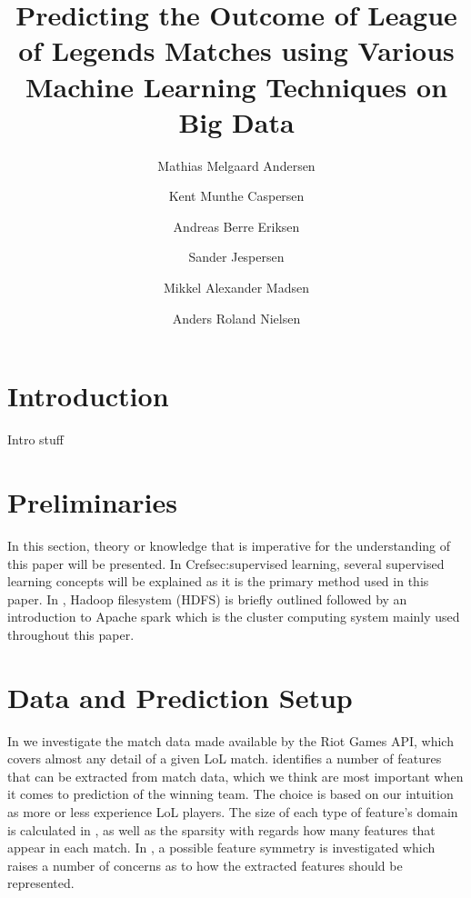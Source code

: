 \documentclass[columns=,boxcolor=white]{datart}
\title{Predicting the Outcome of League of Legends Matches using Various Machine Learning Techniques on Big Data}
\date{}
\author{Mathias Melgaard Andersen}
\author{Kent Munthe Caspersen}
\author{Andreas Berre Eriksen}
\author{Sander Jespersen}
\author{Mikkel Alexander Madsen}
\author{Anders Roland Nielsen}
\affil{Department of Computer Science, Aalborg University}
\begin{document}
\usetikzlibrary{arrows,intersections,shapes.geometric,calc}
\maketitle




\section{Introduction}\label{sec:intro}
Intro stuff





\section{Preliminaries}\label{sec:prelim}
In this section, theory or knowledge that is imperative for the understanding of this paper will be presented. In Cref{sec:supervised learning}, several supervised learning concepts will be explained as it is the primary method used in this paper. In , Hadoop filesystem (HDFS) is briefly outlined followed by an introduction to Apache spark which is the cluster computing system mainly used throughout this paper.




\section{Data and Prediction Setup}\label{sec:features}
In  we investigate the match data made available by the Riot Games API, which covers almost any detail of a given LoL match.
 identifies a number of features that can be extracted from match data, which we think are most important when it comes to prediction of the winning team. The choice is based on our intuition as more or less experience LoL players. The size of each type of feature's domain is calculated in , as well as the sparsity with regards how many features that appear in each match.
In , a possible feature symmetry is investigated which raises a number of concerns as to how the extracted features should be represented. 



\end{document}
